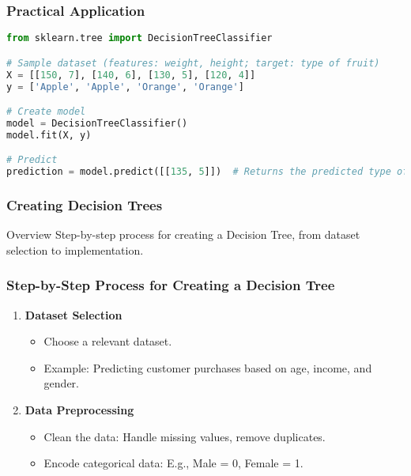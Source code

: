 \documentclass[aspectratio=169]{beamer}
\begin{document}
\begin{frame}[fragile]
    \frametitle{Practical Application}
    \begin{lstlisting}[language=Python]
from sklearn.tree import DecisionTreeClassifier

# Sample dataset (features: weight, height; target: type of fruit)
X = [[150, 7], [140, 6], [130, 5], [120, 4]]
y = ['Apple', 'Apple', 'Orange', 'Orange']

# Create model
model = DecisionTreeClassifier()
model.fit(X, y)

# Predict
prediction = model.predict([[135, 5]])  # Returns the predicted type of fruit
    \end{lstlisting}
\end{frame}

\begin{frame}
    \frametitle{Creating Decision Trees}
    \begin{block}{Overview}
        Step-by-step process for creating a Decision Tree, from dataset selection to implementation.
    \end{block}
\end{frame}

\begin{frame}[fragile]
    \frametitle{Step-by-Step Process for Creating a Decision Tree}
    \begin{enumerate}
        \item \textbf{Dataset Selection}
            \begin{itemize}
                \item Choose a relevant dataset.
                \item Example: Predicting customer purchases based on age, income, and gender.
            \end{itemize}

        \item \textbf{Data Preprocessing}
            \begin{itemize}
                \item Clean the data: Handle missing values, remove duplicates.
                \item Encode categorical data: E.g., Male = 0, Female = 1.
            \end{itemize}
    \end{enumerate}
\end{frame}
\end{document}
